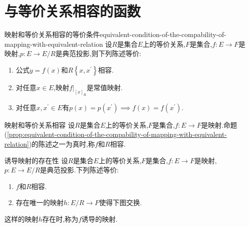 \section{与等价关系相容的函数}

\begin{proposition}{映射和等价关系相容的等价条件}{equivalent-condition-of-the-compability-of-mapping-with-equivalent-relation}
	设$R$是集合$E$上的等价关系,$F$是集合,$f:E\to F$是映射,$p:E\to E/R$是典范投影,则下列陈述等价:
	\begin{enumerate}
		\item 公式$y=f\left(x\right)$和$R\left\{x,x^{\prime}\right\}$相容.
		\item 对任意$x\in E$,映射$f|_{\left[x\right]_{R}}$是常值映射.
		\item 对任意$x,x^{\prime}\in E$有$p\left(x\right)=p\left(x^{\prime}\right)\implies f\left(x\right)=f\left(x^{\prime}\right)$.
	\end{enumerate}
\end{proposition}

\begin{definition}{映射和等价关系相容}{}
	设$R$是集合$E$上的等价关系,$F$是集合,$f:E\to F$是映射.命题(\ref{prop:equivalent-condition-of-the-compability-of-mapping-with-equivalent-relation})的陈述之一为真时,称$f$和$R$相容.
\end{definition}

\begin{metatheorem}{诱导映射的存在性}{}
	设$R$是集合$E$上的等价关系,$F$是集合,$f:E\to F$是映射,$p:E\to E/R$是典范投影.下列陈述等价:
	\begin{enumerate}
		\item $f$和$R$相容.
		\item 存在唯一的映射$h:E/R\to F$使得下图交换.
		\begin{center}
		\end{center}
	\end{enumerate}
	这样的映射$h$存在时,称为$f$诱导的映射.
\end{metatheorem}

